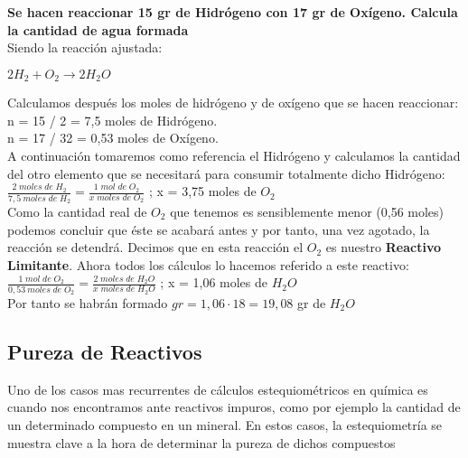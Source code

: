 \begin{exercise}
	\textbf{Se hacen reaccionar 15 gr de Hidrógeno con 17 gr de Oxígeno. Calcula la cantidad de agua formada}\\
	
	Siendo la reacción ajustada:\\
	
	\begin{center}
		$2H_2 + O_2 \longrightarrow 2H_2O$
	\end{center}

Calculamos después los moles de hidrógeno y de oxígeno que se hacen reaccionar:\\

n = 15 / 2 = 7,5 moles de Hidrógeno.\\

n = 17 / 32 = 0,53 moles de Oxígeno.\\

A continuación tomaremos como referencia el Hidrógeno y calculamos la cantidad del otro elemento que se necesitará para consumir totalmente dicho Hidrógeno:\\

$\frac{2\; moles\; de\; H_2}{7,5\: moles\; de\; H_2}=\frac{1 \; mol\; de\; O_2}{x \; moles\; de\; O_2}$ ; x = 3,75 moles de $O_2$\\

Como la cantidad real de $O_2$ que tenemos es sensiblemente menor (0,56 moles) podemos concluir que éste se acabará antes y por tanto, una vez agotado, la reacción se detendrá. Decimos que en esta reacción el $O_2$ es nuestro \textbf{Reactivo Limitante}. Ahora todos los cálculos lo hacemos referido a este reactivo:\\

$\frac{1\; mol\; de\; O_2}{0,53\: moles\; de\; O_2}=\frac{2 \; moles\; de\; H_2O}{x \; moles\; de\; H_2O}$ ; x = 1,06 moles de $H_2O$\\

Por tanto se habrán formado $gr = 1,06 \cdot 18 = 19,08$ gr de $H_2O$

\end{exercise}

\subsection{Pureza de Reactivos}

Uno de los casos mas recurrentes de cálculos estequiométricos en química es cuando nos encontramos ante reactivos impuros, como por ejemplo la cantidad de un determinado compuesto en un mineral. En estos casos, la estequiometría se muestra clave a la hora de determinar la pureza de dichos compuestos\\

